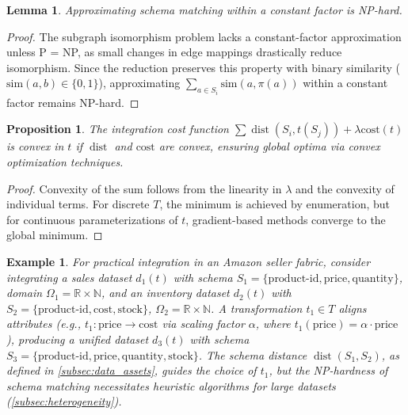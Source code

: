 \documentclass{amsart}
\newtheorem{lem}{Lemma}
\newtheorem{prop}{Proposition}
\newtheorem{exa}{Example}
\newcommand\R{\mathbb R}
\DeclareMathOperator\dist{dist}
\begin{document}
\begin{lem} \label{lem:schema_matching_approx}
Approximating schema matching within a constant factor is NP-hard.
\end{lem}
\begin{proof}
The subgraph isomorphism problem lacks a constant-factor approximation unless P = NP, as small changes in edge mappings drastically reduce isomorphism. Since the reduction preserves this property with binary similarity (\( \text{sim}(a, b) \in \{0, 1\} \)), approximating \( \sum_{a \in S_i} \text{sim}(a, \pi(a)) \) within a constant factor remains NP-hard.
\end{proof}

\begin{prop} \label{prop:integration_cost_convexity}
The integration cost function \( \sum \dist(S_i, t(S_j)) + \lambda \text{cost}(t) \) is convex in \( t \) if \( \dist \) and \( \text{cost} \) are convex, ensuring global optima via convex optimization techniques.
\end{prop}

\begin{proof}
Convexity of the sum follows from the linearity in \( \lambda \) and the convexity of individual terms. For discrete \( T \), the minimum is achieved by enumeration, but for continuous parameterizations of \( t \), gradient-based methods converge to the global minimum.
\end{proof}

\begin{exa}
For practical integration in an Amazon seller fabric, consider integrating a sales dataset \( d_1(t) \) with schema \( S_1 = \{\text{product-id}, \text{price}, \text{quantity}\} \), domain \( \Omega_1 = \R \times \mathbb{N} \), and an inventory dataset \( d_2(t) \) with \( S_2 = \{\text{product-id}, \text{cost}, \text{stock}\} \), \( \Omega_2 = \R \times \mathbb{N} \). A transformation \( t_1 \in T \) aligns attributes (e.g., \( t_1: \text{price} \to \text{cost} \) via scaling factor \( \alpha \), where \( t_1(\text{price}) = \alpha \cdot \text{price} \)), producing a unified dataset \( d_3(t) \) with schema \( S_3 = \{\text{product-id}, \text{price}, \text{quantity}, \text{stock}\} \). The schema distance \( \dist(S_1, S_2) \), as defined in \cref{subsec:data_assets}, guides the choice of \( t_1 \), but the NP-hardness of schema matching necessitates heuristic algorithms for large datasets (\cref{subsec:heterogeneity}).
\end{exa}
\end{document}
